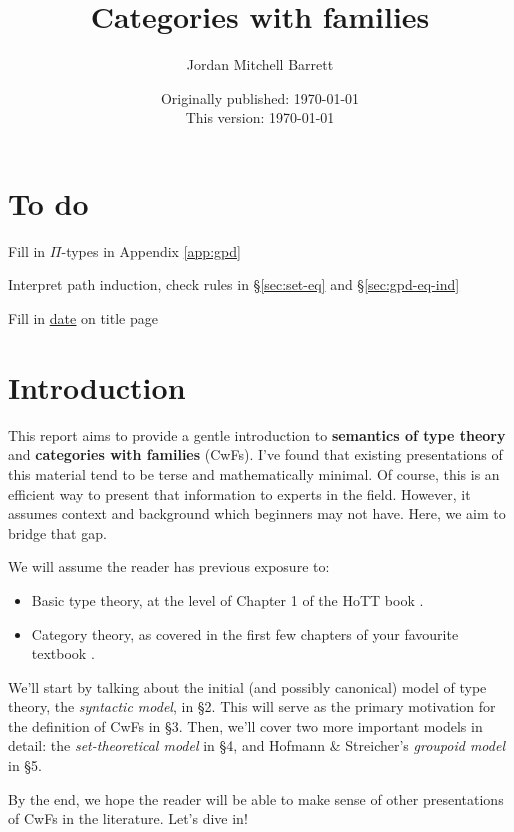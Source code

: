 \documentclass{article}
\title{Categories with families}
\author{Jordan Mitchell Barrett}
\date{Originally published: {\color{red}\label{todo:date} \today} \\[2mm] This version: \today}
\theoremstyle{definition}
\begin{document}
\maketitle
\tableofcontents


{\color{red}
\section*{To do}

Fill in $\Pi$-types in Appendix \ref{app:gpd}

Interpret path induction, check rules in \S\ref{sec:set-eq} and \S\ref{sec:gpd-eq-ind}

Fill in \hyperref[todo:date]{\underline{date}} on title page
}





\section{Introduction}

This report aims to provide a gentle introduction to \textbf{semantics of type theory} and \textbf{categories with families} (CwFs). I've found that existing presentations of this material tend to be terse and mathematically minimal. Of course, this is an efficient way to present that information to experts in the field. However, it assumes context and background which beginners may not have. Here, we aim to bridge that gap.

We will assume the reader has previous exposure to:
\begin{itemize}
    \item Basic type theory, at the level of Chapter 1 of the HoTT book \cite{hottbook}.
    
    \item Category theory, as covered in the first few chapters of your favourite textbook \cite{leinster, maclane}.
\end{itemize}

We'll start by talking about the initial (and possibly canonical) model of type theory, the \textit{syntactic model}, in \S2. This will serve as the primary motivation for the definition of CwFs in \S3. Then, we'll cover two more important models in detail: the \textit{set-theoretical model} in \S4, and Hofmann \& Streicher's \textit{groupoid model} \cite{gpoid} in \S5.

By the end, we hope the reader will be able to make sense of other presentations of CwFs in the literature. Let's dive in!
\end{document}
